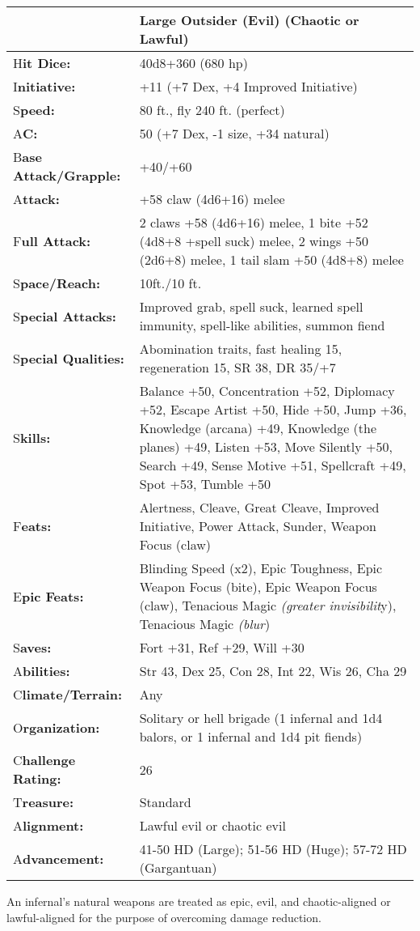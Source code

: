 \documentclass{article}
\begin{document}
\begin{tabular}{|>{\raggedright}p{65pt}|>{\raggedright}p{260pt}|}
\hline
  & Large Outsider (Evil) (Chaotic or Lawful) \tabularnewline
\hline
H\textbf{it Dice:} &  40d8+360 (680 hp) \tabularnewline
\hline
I\textbf{nitiative:} &  +11 (+7 Dex, +4 Improved Initiative) \tabularnewline
\hline
S\textbf{peed:} &  80 ft., fly 240 ft. (perfect) \tabularnewline
\hline
A\textbf{C:} &  50 (+7 Dex, -1 size, +34 natural) \tabularnewline
\hline
B\textbf{ase Attack/Grapple:} &  +40/+60\tabularnewline
\hline
A\textbf{ttack:} &  +58 claw (4d6+16) melee\tabularnewline
\hline
F\textbf{ull Attack:} &  2 claws +58 (4d6+16) melee, 1 bite +52 (4d8+8 +spell suck) 
melee, 2 wings +50 (2d6+8) melee, 1 tail slam +50 (4d8+8) melee\tabularnewline
\hline
S\textbf{pace/Reach:} &  10ft./10 ft. \tabularnewline
\hline
S\textbf{pecial Attacks:} &  Improved grab, spell suck, learned spell immunity, 
spell-like abilities, summon fiend \tabularnewline
\hline
S\textbf{pecial Qualities:} &  Abomination traits, fast healing 15, regeneration 
15, SR 38, DR 35/+7 \tabularnewline
\hline
S\textbf{kills:} &  Balance +50, Concentration +52, Diplomacy +52, Escape Artist 
+50, Hide +50, Jump +36, Knowledge (arcana) +49, Knowledge (the planes) +49, Listen 
+53, Move Silently +50, Search +49, Sense Motive +51, Spellcraft +49, Spot +53, 
Tumble +50\tabularnewline
\hline
F\textbf{eats:} &  Alertness, Cleave, Great Cleave, Improved Initiative, Power 
Attack, Sunder, Weapon Focus (claw) \tabularnewline
\hline
E\textbf{pic Feats:} &  Blinding Speed (x2), Epic Toughness, Epic Weapon Focus 
(bite), Epic Weapon Focus (claw), Tenacious Magic \textit{(greater invisibilit}y), 
Tenacious Magic \textit{(blur}) \tabularnewline
\hline
S\textbf{aves:} &  Fort +31, Ref +29, Will +30 \tabularnewline
\hline
A\textbf{bilities:} &  Str 43, Dex 25, Con 28, Int 22, Wis 26, Cha 29 \tabularnewline
\hline
C\textbf{limate/Terrain:} &  Any \tabularnewline
\hline
O\textbf{rganization:} &  Solitary or hell brigade (1 infernal and 1d4 balors, 
or 1 infernal and 1d4 pit fiends) \tabularnewline
\hline
C\textbf{hallenge Rating:} &  26 \tabularnewline
\hline
T\textbf{reasure:} &  Standard \tabularnewline
\hline
A\textbf{lignment:} &  Lawful evil or chaotic evil \tabularnewline
\hline
A\textbf{dvancement:} &  41-50 HD (Large); 51-56 HD (Huge); 57-72 HD (Gargantuan) 
\tabularnewline
\hline
\end{tabular}

An infernal's natural weapons are treated as epic, evil, and chaotic-aligned or 
lawful-aligned for the purpose of overcoming damage reduction.
\end{document}
